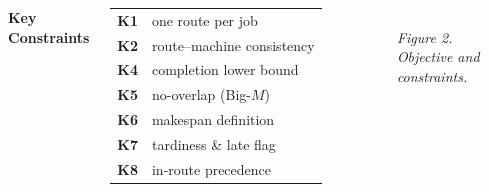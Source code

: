 \documentclass[a0paper,portrait,25pt,margin=12mm,innermargin=12mm,
               blockverticalspace=6mm,colspace=8mm,subcolspace=5mm]{tikzposter}
\begin{document}
\begin{columns}
{\begin{minipage}[t]{0.48\linewidth}
      \vspace{5mm}
      \textbf{\Large Key Constraints}\\[3mm]
      \begin{tabularx}{\linewidth}{>{\bfseries}l X}
        \toprule
        K1 & one route per job\\
        K2 & route–machine consistency\\
        K4 & completion lower bound\\
        K5 & no-overlap (Big-$M$)\\
        K6 & makespan definition\\
        K7 & tardiness \& late flag\\
        K8 & in-route precedence\\
        \bottomrule
      \end{tabularx}\\[3mm]
      \textit{Figure 2. Objective and constraints.}
    \end{minipage}
  }

\end{columns}
\end{document}
